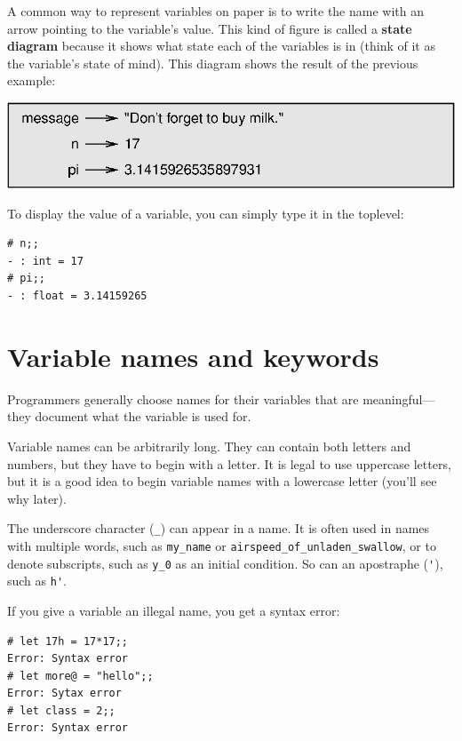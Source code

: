 \documentclass[10pt]{book}
\begin{document}
A common way to represent variables on paper is to write the name with
an arrow pointing to the variable's value.  This kind of figure is
called a {\bf state diagram} because it shows what state each of the
variables is in (think of it as the variable's state of mind).
This diagram shows the result of the previous example:

\beforefig
\centerline{\includegraphics{figs/state2.eps}}
\afterfig

To display the value of a variable, you can simply type it in the toplevel:

\beforeverb
\begin{verbatim}
# n;;
- : int = 17
# pi;;
- : float = 3.14159265
\end{verbatim}
\afterverb

\section{Variable names and keywords}

Programmers generally choose names for their variables that
are meaningful---they document what the variable is used for.

Variable names can be arbitrarily long.  They can contain
both letters and numbers, but they have to begin with a letter.
It is legal to use uppercase letters, but it is a good idea
to begin variable names with a lowercase letter (you'll
see why later).

The underscore character (\verb"_") can appear in a name.
It is often used in names with multiple words, such as
\verb"my_name" or \verb"airspeed_of_unladen_swallow", or 
to denote subscripts, such as \verb"y_0" as an initial 
condition. So can an apostraphe (\verb"'"), such as 
\verb"h'".


If you give a variable an illegal name, you get a syntax 
error:

\beforeverb
\begin{verbatim}
# let 17h = 17*17;;
Error: Syntax error
# let more@ = "hello";;
Error: Sytax error
# let class = 2;;
Error: Syntax error
\end{verbatim}
\afterverb
\end{document}
